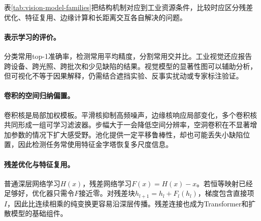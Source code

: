 \begin{table}[htbp]
\centering
\caption{视觉模型族谱与工业选型依据}
\label{tab:vision-model-families}
\scriptsize
\setlength{\tabcolsep}{3pt}
\end{table}

表\ref{tab:vision-model-families}把结构机制对应到工业资源条件，比较时应区分残差优化、特征复用、边缘计算和长距离交互各自解决的问题。
\paragraph{表示学习的评价。}
分类常用top-1准确率，检测常用平均精度，分割常用交并比。工业视觉还应报告跨设备、跨光照、跨批次和少见缺陷的结果。视觉模型的显著性图可以辅助分析，但可视化不等于因果解释，仍需结合遮挡实验、反事实扰动或专家标注验证。

\paragraph{卷积的空间归纳偏置。}
卷积核是局部加权模板。平滑核抑制高频噪声，边缘核响应局部变化，多个卷积核共同形成一组可学习滤波器。步幅大于一会降低空间分辨率，空洞卷积在不显著增加参数的情况下扩大感受野。池化提供一定平移鲁棒性，却也可能丢失小缺陷位置，因此检测任务常使用特征金字塔恢复多尺度信息。

\paragraph{残差优化与特征复用。}
普通深层网络学习$H(x)$，残差网络学习$F(x)=H(x)-x$。若恒等映射已经足够好，优化器只需令$F$接近零。对残差块$h_{l+1}=h_l+F_l(h_l)$，梯度包含直接项$I$，因此比连续相乘的纯变换更容易沿深层传播。残差连接也成为Transformer和扩散模型的基础组件。

